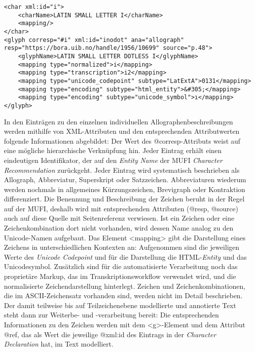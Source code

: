 \documentclass{article}
\begin{document}
        \begin{verbatim}<char xml:id="i">
    <charName>LATIN SMALL LETTER I</charName>
    <mapping/>
</char>
<glyph corresp="#i" xml:id="inodot" ana="allograph"
resp="https://bora.uib.no/handle/1956/10699" source="p.48">
    <glyphName>LATIN SMALL LETTER DOTLESS I</glyphName>
    <mapping type="normalized">i</mapping>
    <mapping type="transcription">i2</mapping>
    <mapping type="unicode_codepoint" subtype="LatExtA">0131</mapping>
    <mapping type="encoding" subtype="html_entity">&#305;</mapping>
    <mapping type="encoding" subtype="unicode_symbol">ı</mapping>
</glyph>\end{verbatim}In den Einträgen zu den einzelnen individuellen Allographenbeschreibungen werden
                  mithilfe von XML-Attributen und den entsprechenden Attributwerten folgende
                  Informationen abgebildet: Der Wert des @corresp-Attributs
                  weist auf eine mögliche hierarchische Verknüpfung hin. Jeder Eintrag erhält einen
                  eindeutigen Identifikator, der auf den \emph{Entity Name} der MUFI
                     \emph{Character Recommendation} zurückgeht. Jeder Eintrag wird
                  systematisch beschrieben als Allograph, Abbreviatur, Superskript oder Satzzeichen.
                  Abbreviaturen wiederum werden nochmals in allgemeines Kürzungszeichen, Brevigraph
                  oder Kontraktion differenziert. Die Benennung und Beschreibung der Zeichen beruht
                  in der Regel auf der MUFI, deshalb wird mit entsprechenden Attributen
                  (@resp, @source) auch auf diese
                  Quelle mit Seitenreferenz verwiesen. Ist ein Zeichen oder eine Zeichenkombination
                  dort nicht vorhanden, wird dessen Name analog zu den Unicode-Namen aufgebaut. Das
                  Element <mapping> gibt die Darstellung eines
                  Zeichens in unterschiedlichen Kontexten an: Aufgenommen sind die jeweiligen Werte
                  des \emph{Unicode Codepoint} und für die Darstellung die HTML-\emph{Entity} und das Unicodesymbol. Zusätzlich sind für die
                  automatisierte Verarbeitung noch das proprietäre Markup, das im
                  Transkriptionsworkflow verwendet wird, und die normalisierte Zeichendarstellung
                  hinterlegt. Zeichen und Zeichenkombinationen, die im ASCII-Zeichensatz vorhanden
                  sind, werden nicht im Detail beschrieben.\\
            
        Der damit teilweise bis auf Teilzeichenebene modellierte und annotierte Text steht
                  dann zur Weiterbe- und -verarbeitung bereit: Die entsprechenden Informationen zu
                  den Zeichen werden mit dem <g>-Element und
                  dem Attribut @ref, das als Wert die jeweilige
                  @xml:id des Eintrags in der \emph{Character
                     Declaration} hat, im Text modelliert. \\
            
\end{document}
